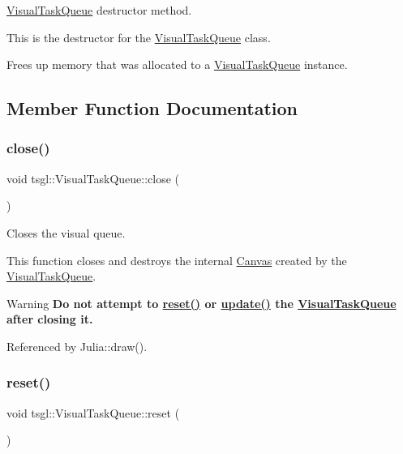 \hyperlink{classtsgl_1_1_visual_task_queue}{Visual\+Task\+Queue} destructor method. 

This is the destructor for the \hyperlink{classtsgl_1_1_visual_task_queue}{Visual\+Task\+Queue} class.

Frees up memory that was allocated to a \hyperlink{classtsgl_1_1_visual_task_queue}{Visual\+Task\+Queue} instance. 

\subsection{Member Function Documentation}
\mbox{\label{classtsgl_1_1_visual_task_queue_a7340d211424a9f947152fed22cce4d79}} 
\subsubsection{\texorpdfstring{close()}{close()}}
{\footnotesize\ttfamily void tsgl\+::\+Visual\+Task\+Queue\+::close (\begin{DoxyParamCaption}{ }\end{DoxyParamCaption})}



Closes the visual queue. 

This function closes and destroys the internal \hyperlink{classtsgl_1_1_canvas}{Canvas} created by the \hyperlink{classtsgl_1_1_visual_task_queue}{Visual\+Task\+Queue}. \begin{DoxyWarning}{Warning}
{\bfseries  Do not attempt to \hyperlink{classtsgl_1_1_visual_task_queue_a1cd23a5361c0209ac950db6afcd68a19}{reset()} or \hyperlink{classtsgl_1_1_visual_task_queue_a2fc5733a57213a6eee116408738851fc}{update()} the \hyperlink{classtsgl_1_1_visual_task_queue}{Visual\+Task\+Queue} after closing it.} 
\end{DoxyWarning}


Referenced by Julia\+::draw().

\mbox{\label{classtsgl_1_1_visual_task_queue_a1cd23a5361c0209ac950db6afcd68a19}} 
\subsubsection{\texorpdfstring{reset()}{reset()}}
{\footnotesize\ttfamily void tsgl\+::\+Visual\+Task\+Queue\+::reset (\begin{DoxyParamCaption}{ }\end{DoxyParamCaption})}



